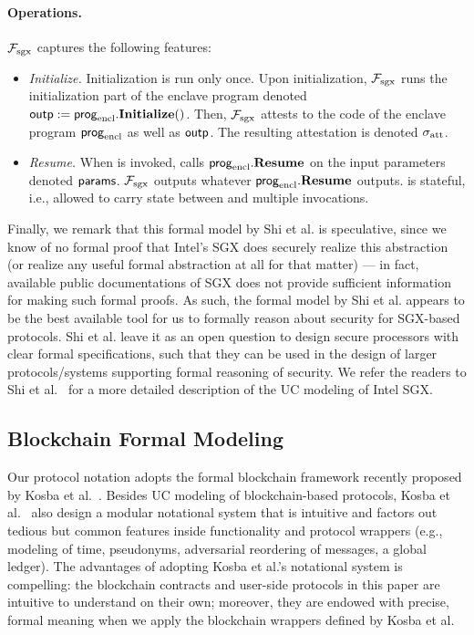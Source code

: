 \paragraph{Operations.}
$\mathcal{F}_{\textrm{sgx}}$ captures the following features:
\begin{itemize}[leftmargin=5mm]
\item
{\it Initialize.}
Initialization is run only once.
Upon initialization, $\mathcal{F}_{\textrm{sgx}}$
runs the initialization part of the enclave program
denoted ${\sf outp} := {\sf prog}_{\textrm{encl}}.{\bf Initialize}()$.
Then, $\mathcal{F}_{\textrm{sgx}}$ 
attests to the code of the enclave program ${\sf prog}_{\textrm{encl}}$ 
as well as ${\sf outp}$.
The resulting attestation is denoted 
${\sigma_{\textrm{att}}}$.
\item
{\it Resume.}
When  is invoked,
\fsgx 
calls ${\sf prog}_{\textrm{encl}}.{\bf Resume}$
on the input parameters denoted ${\sf params}$.
$\mathcal{F}_{\textrm{sgx}}$ 
outputs whatever ${\sf prog}_{\textrm{encl}}.{\bf Resume}$ outputs.
\fsgx is stateful, i.e., allowed to carry state
between  and multiple 
invocations.
\end{itemize}

Finally, we remark that this formal model by Shi et al.
is speculative,   
since we know of no formal
proof that Intel's SGX does securely realize this abstraction (or 
realize any useful formal
abstraction at all for that matter) --- 
in fact, available public documentations of SGX
does not provide sufficient information for making such formal proofs. 
As such, the formal model by Shi et al. 
appears to be the best available tool for us to 
formally reason about 
security 
for SGX-based protocols. 
Shi et al. leave it as an open question to design secure processors
with clear formal specifications, such that 
they can be used in the design of larger protocols/systems 
supporting formal reasoning of security.
We refer the readers to Shi et al.~\cite{sgxsok} 
for a more detailed description of the UC modeling of Intel SGX.


\subsection{Blockchain Formal Modeling}
\label{sec:blockchainmodel}

Our protocol notation adopts the formal blockchain
framework recently proposed by Kosba et al.~\cite{hawk}.
Besides UC modeling of blockchain-based protocols, 
Kosba et al.~\cite{hawk} also 
design a modular notational system  
that is intuitive and factors out tedious but common   
features inside functionality and protocol wrappers (e.g.,
modeling of time, pseudonyms, adversarial reordering of messages, 
a global ledger).
The advantages of 
adopting Kosba et al.'s notational system is compelling:
the 
blockchain contracts and user-side protocols
in this paper are 
intuitive to understand on their own; moreover,
they are endowed with precise, formal meaning
when  we apply the blockchain wrappers defined
by Kosba et al.


